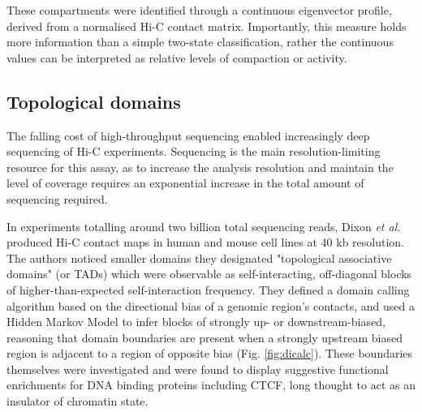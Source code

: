 \documentclass[a4paper,10pt,oneside]{book}
\begin{document}
These compartments were identified through a continuous eigenvector profile, derived from a normalised Hi-C contact matrix.\cite{Lieberman2009} Importantly, this measure holds more information than a simple two-state classification, rather the continuous values can be interpreted as relative levels of compaction or activity.\cite{Dekker2013, Imakaev2012}

\subsection{Topological domains}\label{intro:tads}

The falling cost of high-throughput sequencing enabled increasingly deep sequencing of Hi-C experiments. Sequencing is the main resolution-limiting resource for this assay, as to increase the analysis resolution and maintain the level of coverage requires an exponential increase in the total amount of sequencing required.\cite{Lieberman2009, Tanay2013}

In experiments totalling around two billion total sequencing reads, Dixon \emph{et al.}\cite{Dixon2012} produced Hi-C contact maps in human and mouse cell lines at 40 kb resolution. The authors noticed smaller domains they designated "topological associative domains" (or TADs) which were observable as self-interacting, off-diagonal blocks of higher-than-expected self-interaction frequency. They defined a domain calling algorithm based on the directional bias of a genomic region's contacts, and used a Hidden Markov Model to infer blocks of strongly up- or downstream-biased, reasoning that domain boundaries are present when a strongly upstream biased region is adjacent to a region of opposite bias (Fig. \ref{fig:dicalc}). These boundaries themselves were investigated and were found to display suggestive functional enrichments for DNA binding proteins including CTCF, long thought to act as an insulator of chromatin state.
\end{document}
